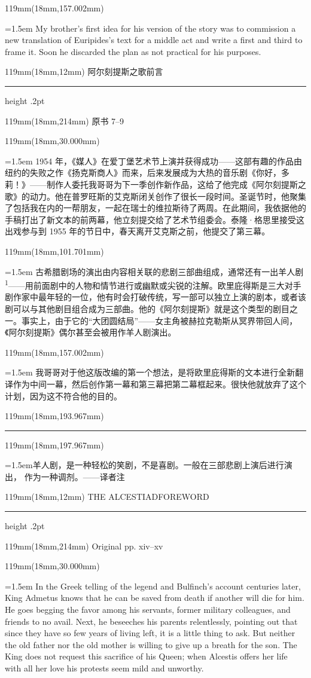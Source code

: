 \documentclass{article}
\newcommand{\ENsetup}{\normalfont\color{ink}\fontsize{11}{16.5}\selectfont\emergencystretch=1.5em}
\newcommand{\ZHsetup}{\normalfont\color{ink}\fontsize{10.5}{17}\selectfont\emergencystretch=1.5em}
\newcommand{\Note}[2]{\par\hangindent=1.5em\hangafter=1\noindent\makebox[1.5em][l]{#1}#2\par}
\newcommand{\Block}[3]{\begin{textblock*}{119mm}(18mm,#1mm){#2 #3\par}\end{textblock*}}
\newcommand{\Heading}[3]{%
  \begin{textblock*}{119mm}(18mm,12mm)
    \color{quiet}\fontsize{7.5}{10}\selectfont
    #1\hfill #2\par\vspace{3mm}\hrule height .2pt
  \end{textblock*}
  \begin{textblock*}{119mm}(18mm,214mm)
    \color{quiet}\fontsize{7}{10}\selectfont #3\hfill\thepage
  \end{textblock*}
}
\begin{document}
\Block{157.002}{\ENsetup}{My brother's first idea for his version of the story was to commission a new translation of Euripides's text for a middle act and write a first and third to frame it. Soon he discarded the plan as not practical for his purposes.\par}
\newpage
\null
\Heading{阿尔刻提斯之歌}{前言}{原书 7–9}
\Block{30.000}{\ZHsetup}{1954 年，《媒人》在爱丁堡艺术节上演并获得成功——这部有趣的作品由纽约的失败之作《扬克斯商人》而来，后来发展成为大热的音乐剧《你好，多莉！》——制作人委托我哥哥为下一季创作新作品，这给了他完成《阿尔刻提斯之歌》的动力。他在普罗旺斯的艾克斯闭关创作了很长一段时间。圣诞节时，他聚集了包括我在内的一帮朋友，一起在瑞士的维拉斯待了两周。在此期间，我依据他的手稿打出了新文本的前两幕，他立刻提交给了艺术节组委会。泰隆·格思里接受这出戏参与到 1955 年的节日中，春天离开艾克斯之前，他提交了第三幕。\par }
\Block{101.701}{\ZHsetup}{古希腊剧场的演出由内容相关联的悲剧三部曲组成，通常还有一出羊人剧\textsuperscript{1}——用前面剧中的人物和情节进行或幽默或尖锐的注解。欧里庇得斯是三大对手剧作家中最年轻的一位，他有时会打破传统，写一部可以独立上演的剧本，或者该剧可以与其他剧目组合成为三部曲。他的《阿尔刻提斯》就是这个类型的剧目之一。事实上，由于它的“大团圆结局”——女主角被赫拉克勒斯从冥界带回人间，《阿尔刻提斯》偶尔甚至会被用作羊人剧演出。\par }
\Block{157.002}{\ZHsetup}{我哥哥对于他这版改编的第一个想法，是将欧里庇得斯的文本进行全新翻译作为中间一幕，然后创作第一幕和第三幕把第二幕框起来。很快他就放弃了这个计划，因为这不符合他的目的。\par }
\begin{textblock*}{119mm}(18mm,193.967mm)\color{ink}\rule{30mm}{.25pt}\end{textblock*}
\begin{textblock*}{119mm}(18mm,197.967mm)\normalfont\color{ink}\fontsize{7.5}{11}\selectfont \Note{1}{羊人剧，是一种轻松的笑剧，不是喜剧。一般在三部悲剧上演后进行演出， 作为一种调剂。——译者注}\end{textblock*}
\newpage
\null
\Heading{THE ALCESTIAD}{FOREWORD}{Original pp. xiv–xv}
\Block{30.000}{\ENsetup}{In the Greek telling of the legend and Bulfinch's account centuries later, King Admetus knows that he can be saved from death if another will die for him. He goes begging the favor among his servants, former military colleagues, and friends to no avail. Next, he beseeches his parents relentlessly, pointing out that since they have so few years of living left, it is a little thing to ask. But neither the old father nor the old mother is willing to give up a breath for the son. The King does not request this sacrifice of his Queen; when Alcestis offers her life with all her love his protests seem mild and unworthy.\par}
\end{document}
